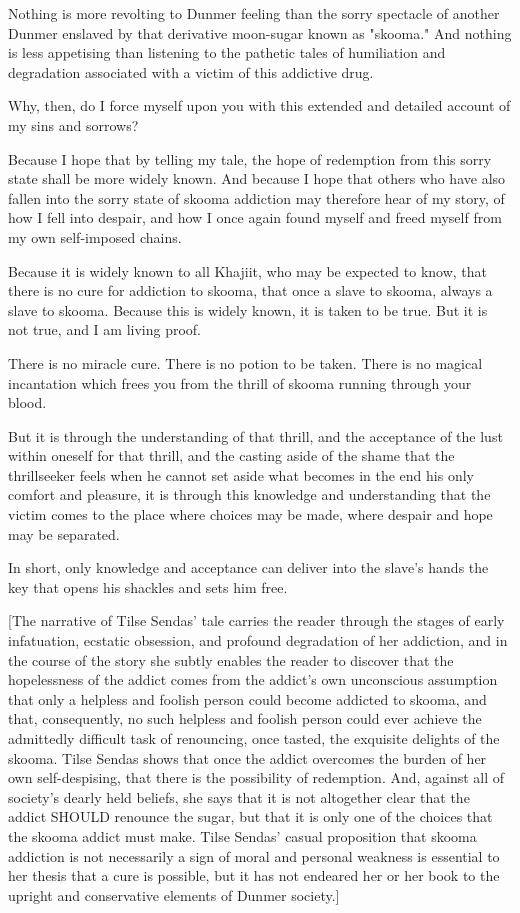 
\dropcap Nothing is more revolting to Dunmer feeling than the sorry spectacle of another Dunmer enslaved by that derivative moon-sugar known as "skooma." And nothing is less appetising than listening to the pathetic tales of humiliation and degradation associated with a victim of this addictive drug.

Why, then, do I force myself upon you with this extended and detailed account of my sins and sorrows?

Because I hope that by telling my tale, the hope of redemption from this sorry state shall be more widely known. And because I hope that others who have also fallen into the sorry state of skooma addiction may therefore hear of my story, of how I fell into despair, and how I once again found myself and freed myself from my own self-imposed chains.

Because it is widely known to all Khajiit, who may be expected to know, that there is no cure for addiction to skooma, that once a slave to skooma, always a slave to skooma. Because this is widely known, it is taken to be true. But it is not true, and I am living proof.

There is no miracle cure. There is no potion to be taken. There is no magical incantation which frees you from the thrill of skooma running through your blood.

But it is through the understanding of that thrill, and the acceptance of the lust within oneself for that thrill, and the casting aside of the shame that the thrillseeker feels when he cannot set aside what becomes in the end his only comfort and pleasure, it is through this knowledge and understanding that the victim comes to the place where choices may be made, where despair and hope may be separated.

In short, only knowledge and acceptance can deliver into the slave's hands the key that opens his shackles and sets him free.

[The narrative of Tilse Sendas' tale carries the reader through the stages of early infatuation, ecstatic obsession, and profound degradation of her addiction, and in the course of the story she subtly enables the reader to discover that the hopelessness of the addict comes from the addict's own unconscious assumption that only a helpless and foolish person could become addicted to skooma, and that, consequently, no such helpless and foolish person could ever achieve the admittedly difficult task of renouncing, once tasted, the exquisite delights of the skooma. Tilse Sendas shows that once the addict overcomes the burden of her own self-despising, that there is the possibility of redemption. And, against all of society's dearly held beliefs, she says that it is not altogether clear that the addict SHOULD renounce the sugar, but that it is only one of the choices that the skooma addict must make. Tilse Sendas' casual proposition that skooma addiction is not necessarily a sign of moral and personal weakness is essential to her thesis that a cure is possible, but it has not endeared her or her book to the upright and conservative elements of Dunmer society.]